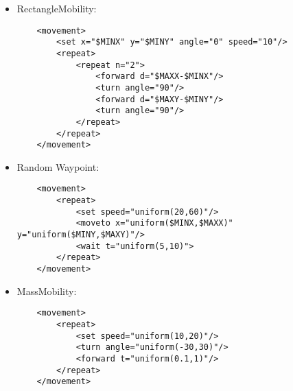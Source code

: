 \begin{itemize}
\item RectangleMobility:

\begin{verbatim}
    <movement>
        <set x="$MINX" y="$MINY" angle="0" speed="10"/>
        <repeat>
            <repeat n="2">
                <forward d="$MAXX-$MINX"/>
                <turn angle="90"/>
                <forward d="$MAXY-$MINY"/>
                <turn angle="90"/>
            </repeat>
        </repeat>
    </movement>
\end{verbatim}

\item Random Waypoint:

\begin{verbatim}
    <movement>
        <repeat>
            <set speed="uniform(20,60)"/>
            <moveto x="uniform($MINX,$MAXX)" y="uniform($MINY,$MAXY)"/>
            <wait t="uniform(5,10)">
        </repeat>
    </movement>
\end{verbatim}

\item MassMobility:

\begin{verbatim}
    <movement>
        <repeat>
            <set speed="uniform(10,20)"/>
            <turn angle="uniform(-30,30)"/>
            <forward t="uniform(0.1,1)"/>
        </repeat>
    </movement>
\end{verbatim}

\end{itemize}




